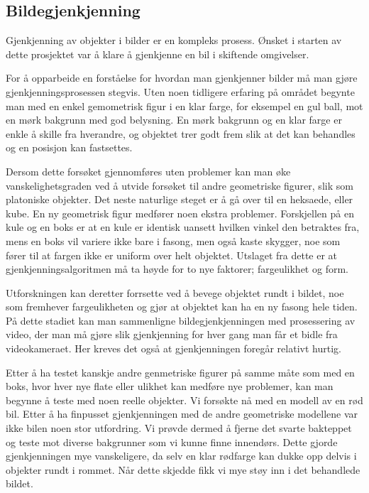 \subsection{Bildegjenkjenning}

Gjenkjenning av objekter i bilder er en kompleks prosess. Ønsket i starten av dette prosjektet var å klare å gjenkjenne en bil i skiftende omgivelser. 

For å opparbeide en forståelse for hvordan man gjenkjenner bilder må man gjøre gjenkjenningsprosessen stegvis. Uten noen tidligere erfaring på området begynte man med en enkel gemometrisk figur i en klar farge, for eksempel en gul ball, mot en mørk bakgrunn med god belysning. En mørk bakgrunn og en klar farge er enkle å skille fra hverandre, og objektet trer godt frem slik at det kan behandles og en posisjon kan fastsettes.

Dersom dette forsøket gjennomføres uten problemer kan man øke vanskelighetsgraden ved å utvide forsøket til andre geometriske figurer, slik som platoniske objekter. Det neste naturlige steget er å gå over til en heksaede, eller kube. En ny geometrisk figur medfører noen ekstra problemer. Forskjellen på en kule og en boks er at en kule er identisk uansett hvilken vinkel den betraktes fra, mens en boks vil variere ikke bare i fasong, men også kaste skygger, noe som fører til at fargen ikke er uniform over helt objektet. Utslaget fra dette er at gjenkjenningsalgoritmen må ta høyde for to nye faktorer; fargeulikhet og form. 

Utforskningen kan deretter forrsette ved å bevege objektet rundt i bildet, noe som fremhever fargeulikheten og gjør at objektet kan ha en ny fasong hele tiden. På dette stadiet kan man sammenligne bildegjenkjenningen med prosessering av video, der man må gjøre slik gjenkjenning for hver gang man får et bidle fra videokameraet. Her kreves det også at gjenkjenningen foregår relativt hurtig. 

Etter å ha testet kanskje andre genmetriske figurer på samme måte som med en boks, hvor hver nye flate eller ulikhet kan medføre nye problemer, kan man begynne å teste med noen reelle objekter. Vi forsøkte nå med en modell av en rød bil. Etter å ha finpusset gjenkjenningen med de andre geometriske modellene var ikke bilen noen stor utfordring. Vi prøvde dermed å fjerne det svarte bakteppet og teste mot diverse bakgrunner som vi kunne finne innendørs. Dette gjorde gjenkjenningen mye vanskeligere, da selv en klar rødfarge kan dukke opp delvis i objekter rundt i rommet. Når dette skjedde fikk vi mye støy inn i det behandlede bildet.

